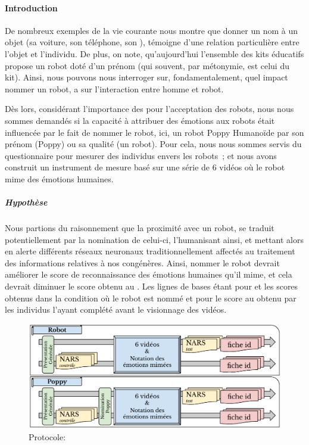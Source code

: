         \paragraph{Introduction}
            De nombreux exemples de la vie courante nous montre que donner un nom à un objet (\eg sa voiture, son téléphone, son ), témoigne d'une relation particulière entre l'objet et l'individu. De plus, on note, qu'aujourd'hui l'ensemble des kits éducatifs propose un robot doté d'un prénom (qui souvent, par métonymie, est celui du kit). Ainsi, nous pouvons nous interroger sur, fondamentalement, quel impact nommer un robot, a sur l'interaction  entre homme et robot.\par%
            Dès lors, considérant l’importance des  pour l’acceptation des robots, nous nous sommes demandés si la capacité à attribuer des émotions aux robots était influencée par le fait de nommer le robot, ici, un robot Poppy Humanoïde par son prénom (Poppy) ou sa qualité (un robot). Pour cela, nous nous sommes servis du questionnaire  pour mesurer  des individus envers les robots~; et nous avons construit un instrument de mesure basé sur une série de 6 vidéos où le robot mime des émotions humaines.
            \subparagraph{Hypothèse}
                Nous partions du raisonnement que la proximité avec un robot, se traduit potentiellement par la nomination de celui-ci, l'humanisant ainsi, et mettant alors en alerte différents réseaux neuronaux traditionnellement affectés au traitement des informations relatives à nos congénères. 
                Ainsi, \Li nommer le robot devrait améliorer le score de reconnaissance des émotions humaines qu'il mime, et \ii cela devrait diminuer le score obtenu au . Les lignes de bases étant pour \Li et \ii les scores obtenus dans la condition où le robot est nommé  et pour \ii le score au  obtenu par les individus l'ayant complété avant le visionnage des vidéos.
                \begin{figure}[!h]
                    \centering
                    \includegraphics[width=\linewidth]{Figures/Desprez-proto-name_for_bot.pdf}
                    \caption{Protocole: }\label{fig:proto-name_for_bot}
                \end{figure}
